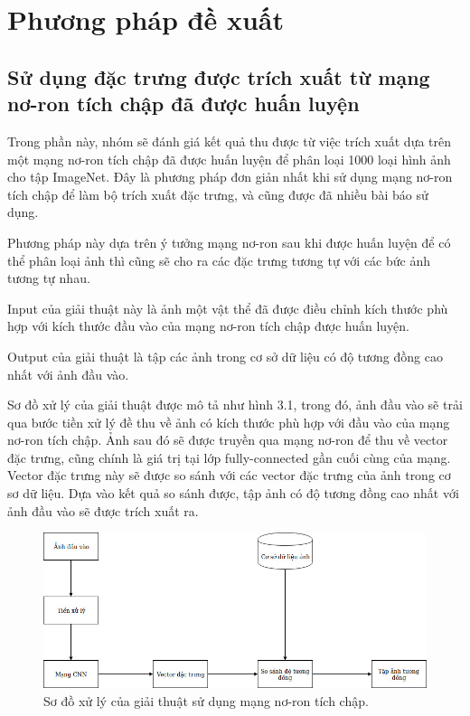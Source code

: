 \documentclass[a4paper,14pt]{extreport}
\begin{document}
\section{ Phương pháp đề xuất }

\subsection{Sử dụng đặc trưng được trích xuất từ mạng nơ-ron tích chập đã được huấn luyện}
Trong phần này, nhóm sẽ đánh giá kết quả thu được từ việc trích xuất dựa trên một mạng nơ-ron tích 
chập đã được huấn luyện để phân loại 1000 loại hình ảnh cho tập ImageNet. Đây là phương pháp đơn 
giản nhất khi sử dụng mạng nơ-ron tích chập để làm bộ trích xuất đặc trưng, và cũng được đã nhiều bài báo sử dụng.

Phương pháp này dựa trên ý tưởng mạng nơ-ron sau khi được huấn luyện để có thể phân loại ảnh thì cũng sẽ cho 
ra các đặc trưng tương tự với các bức ảnh tương tự nhau.

Input của giải thuật này là ảnh một vật thể đã được điều chỉnh kích thước phù hợp với kích thước đầu vào của mạng nơ-ron tích chập được huấn luyện.

Output của giải thuật là tập các ảnh trong cơ sở dữ liệu có độ tương đồng cao nhất với ảnh đầu vào.

Sơ đồ xử lý của giải thuật được mô tả như hình 3.1, trong đó, ảnh đầu vào sẽ trải qua bước tiền xử lý đề thu về ảnh có kích thước phù hợp với đầu vào của mạng nơ-ron tích chập. Ảnh sau đó sẽ được truyền qua mạng nơ-ron để thu về vector đặc trưng, cũng chính là giá trị tại lớp fully-connected gần cuối cùng của mạng. Vector đặc trưng này sẽ được so sánh với các vector đặc trưng của ảnh trong cơ sơ dữ liệu. Dựa vào kết quả so sánh được, tập ảnh có độ tương đồng cao nhất với ảnh đầu vào sẽ được trích xuất ra.

\begin{figure}  
    \centering
    \includegraphics[scale=0.5]{img/cnn-feature-extractor.jpg}
    \caption{Sơ đồ xử lý của giải thuật sử dụng mạng nơ-ron tích chập.}
\end{figure}    
\end{document}
